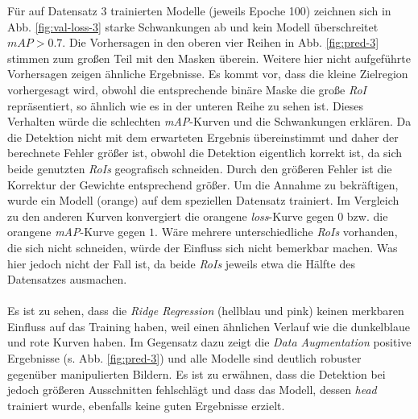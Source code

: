 Für auf Datensatz 3 trainierten Modelle (jeweils Epoche 100) zeichnen sich in  Abb. \ref{fig:val-loss-3} starke Schwankungen ab und kein Modell überschreitet $mAP>0.7$. Die Vorhersagen in den oberen vier Reihen in Abb. \ref{fig:pred-3} stimmen zum großen Teil mit den Masken überein. Weitere hier nicht aufgeführte Vorhersagen zeigen ähnliche Ergebnisse. Es kommt vor, dass die kleine Zielregion vorhergesagt wird, obwohl die entsprechende binäre Maske die große \textit{RoI} repräsentiert, so ähnlich wie es in der unteren Reihe zu sehen ist. Dieses Verhalten würde die schlechten \textit{mAP}-Kurven und die Schwankungen erklären. Da die Detektion nicht mit dem erwarteten Ergebnis übereinstimmt und daher der berechnete Fehler größer ist, obwohl die Detektion eigentlich korrekt ist, da sich beide genutzten \textit{RoIs} geografisch schneiden. Durch den größeren Fehler ist die Korrektur der Gewichte entsprechend größer. Um die Annahme zu bekräftigen, wurde ein Modell (orange) auf dem speziellen Datensatz trainiert. Im Vergleich zu den anderen Kurven konvergiert die orangene \textit{loss}-Kurve gegen $0$ bzw. die orangene \textit{mAP}-Kurve gegen $1$. Wäre mehrere unterschiedliche \textit{RoIs} vorhanden, die sich nicht schneiden, würde der Einfluss sich nicht bemerkbar machen. Was hier jedoch nicht der Fall ist, da beide \textit{RoIs} jeweils etwa die Hälfte des Datensatzes ausmachen.
\\\\
Es ist zu sehen, dass die \textit{Ridge Regression} (hellblau und pink) keinen merkbaren Einfluss auf das Training haben, weil einen ähnlichen Verlauf wie die dunkelblaue und rote Kurven haben. Im Gegensatz dazu zeigt die \textit{Data Augmentation} positive Ergebnisse (s. Abb. \ref{fig:pred-3}) und alle Modelle sind deutlich robuster gegenüber manipulierten Bildern. Es ist zu erwähnen, dass die Detektion bei jedoch größeren Ausschnitten fehlschlägt und dass das Modell, dessen \textit{head} trainiert wurde, ebenfalls keine guten Ergebnisse erzielt.

